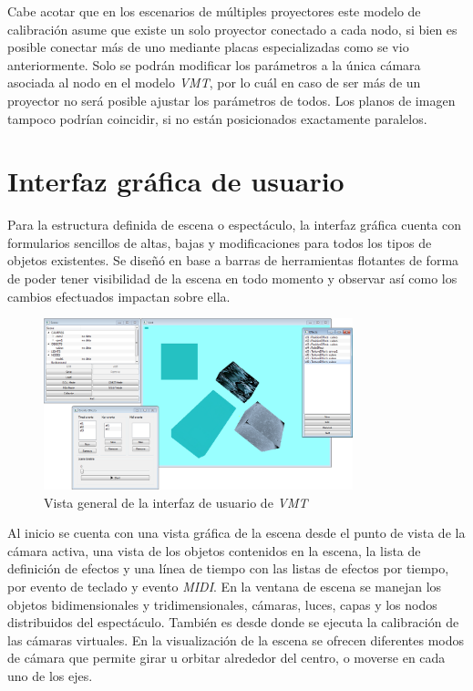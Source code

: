 Cabe acotar que en los escenarios de múltiples proyectores este modelo de calibración asume que existe un solo proyector conectado a cada nodo, si bien es posible conectar más de uno mediante placas especializadas como se vio anteriormente. Solo se podrán modificar los parámetros a la única cámara asociada al nodo en el modelo \emph{VMT}, por lo cuál en caso de ser más de un proyector no será posible ajustar los parámetros de todos. Los planos de imagen tampoco podrían coincidir, si no están posicionados exactamente paralelos.


\section{Interfaz gráfica de usuario}

Para la estructura definida de escena o espectáculo, la interfaz gráfica cuenta con formularios sencillos de altas, bajas y modificaciones para todos los tipos de objetos existentes. Se diseñó en base a barras de herramientas flotantes de forma de poder tener visibilidad de la escena en todo momento y observar así como los cambios efectuados impactan sobre ella.

\begin{figure}[H]
  \centering
    \includegraphics[width=0.8\textwidth]{./Cap5_vmt/vmt_todo.png}
  \caption{Vista general de la interfaz de usuario de \emph{VMT}}
  \label{fig:VMT-MainWindow}
\end{figure}

Al inicio se cuenta con una vista gráfica de la escena desde el punto de vista de la cámara activa, una vista de los objetos contenidos en la escena, la lista de definición de efectos y una línea de tiempo con las listas de efectos por tiempo, por evento de teclado y evento \emph{MIDI}.
En la ventana de escena se manejan los objetos bidimensionales y tridimensionales, cámaras, luces, capas y los nodos distribuidos del espectáculo. También es desde donde se ejecuta la calibración de las cámaras virtuales. En la visualización de la escena se ofrecen diferentes modos de cámara que permite girar u orbitar alrededor del centro, o moverse en cada uno de los ejes.

